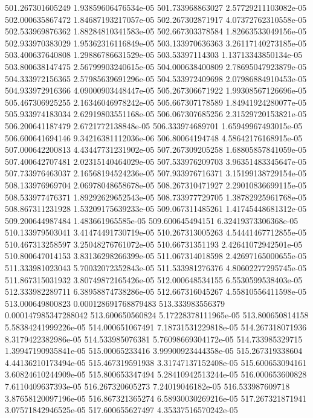 {501.267301605249 1.93859606476534e-05
501.733968863027 2.57729211103082e-05
502.000635867472 1.84687193217057e-05
502.267302871917 4.07372762310558e-05
502.533969876362 1.88284810341583e-05
502.667303378584 1.82663533049156e-05
502.933970383029 1.95362316116849e-05
503.133970636363 3.26117140273185e-05
503.400637640808 1.29886786631529e-05
503.53397114303 1.13713343850134e-05
503.800638147475 2.56799903240615e-05
504.000638400809 2.78695047923879e-05
504.333972156365 2.57985639691296e-05
504.533972409698 2.07986884910453e-05
504.933972916366 4.09000903448447e-05
505.267306671922 1.99308567126696e-05
505.467306925255 2.16346046978242e-05
505.667307178589 1.84941924280077e-05
505.933974183034 2.62919803551168e-05
506.067307685256 2.31529720153821e-05
506.200641187479 2.6721772138848e-05
506.333974689701 1.65949967493015e-05
506.600641694146 9.34216381112036e-06
506.80064194748 4.58642176168915e-05
507.000642200813 4.43447731231902e-05
507.267309205258 1.68805857841059e-05
507.400642707481 2.02315140464029e-05
507.533976209703 3.96351483345647e-05
507.733976463037 2.16568194524236e-05
507.933976716371 3.15199138729154e-05
508.133976969704 2.06978048658678e-05
508.267310471927 2.29010836699115e-05
508.533977476371 1.89292629652543e-05
508.733977729705 1.38782925961768e-05
508.867311231928 1.53209175639233e-05
509.067311485261 1.41745448681312e-05
509.200644987484 1.483661965585e-05
509.600645494151 6.32419373306368e-05
510.133979503041 3.41474491730719e-05
510.267313005263 4.54441467712855e-05
510.467313258597 3.25048276761072e-05
510.66731351193 2.42641072942501e-05
510.800647014153 3.83136298266399e-05
511.067314018598 2.42697165000655e-05
511.333981023043 5.70032072352843e-05
511.533981276376 4.80602277295745e-05
511.867315031932 3.80749872165426e-05
512.000648534155 6.5530599538403e-05
512.333982289711 6.38958874738286e-05
512.667316045267 4.55810556411598e-05
513.000649800823 0.000128691768879483
513.333983556379 0.000147985347288042
513.600650560824 5.17228378111965e-05
513.800650814158 5.58384241999226e-05
514.000651067491 7.18731531229818e-05
514.267318071936 8.3179422382986e-05
514.533985076381 5.76098669304172e-05
514.733985329715 1.39947190935841e-05
515.00065233416 3.99900923444358e-05
515.267319338604 4.44136210173494e-05
515.467319591938 3.31747137152408e-05
515.600653094161 3.60824610244909e-05
515.800653347494 5.28410942513244e-05
516.000653600828 7.6110409637393e-05
516.267320605273 7.24019046182e-05
516.533987609718 3.87658120097196e-05
516.867321365274 6.58930030269216e-05
517.267321871941 3.07571842946525e-05
517.600655627497 4.35337516570242e-05
}
